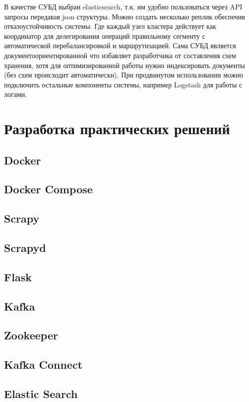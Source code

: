 В качестве СУБД выбран elasticsearch, т.к. им удобно пользоваться через API
запросы передавая json структуры. Можно создать несколько реплик обеспечив
отказоустойчивость системы. Где каждый узел кластера действует как координатор
для делегирования операций правильному сегменту с автоматической
перебалансировкой и маршрутизацией. Сама СУБД является документоориентированной
что избавляет разработчика от составления схем хранения, хотя для
оптимизированной работы нужно индексировать документы (без схем происходит
автоматически). При продвинутом использовании можно подключить остальные
компоненты системы, например Logstash для работы с логами.

\section{Разработка практических решений}
\subsection{Docker}
\subsection{Docker Compose}
\subsection{Scrapy}
\subsection{Scrapyd}
\subsection{Flask}
\subsection{Kafka}
\subsection{Zookeeper}
\subsection{Kafka Connect}
\subsection{Elastic Search}

